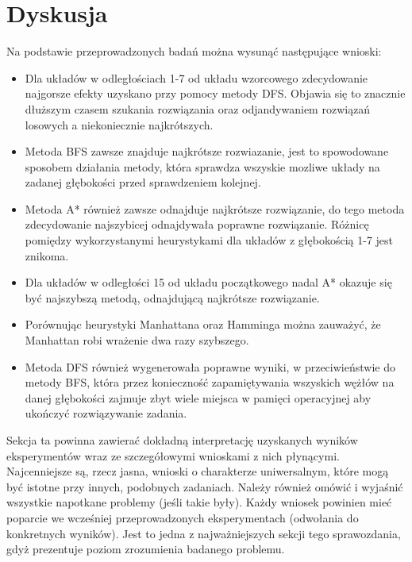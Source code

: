 \documentclass{classrep}
\begin{document}
    \section{Dyskusja}
    {\color{blue}

    Na podstawie przeprowadzonych badań można wysunąć następujące wnioski:
    \begin{itemize}
        \item Dla układów w odległościach 1-7 od układu wzorcowego zdecydowanie najgorsze efekty uzyskano przy pomocy metody DFS.
            Objawia się to znacznie dłuższym czasem szukania rozwiązania oraz odjandywaniem rozwiązań losowych a niekoniecznie najkrótszych.
        \item Metoda BFS zawsze znajduje najkrótsze rozwiazanie, jest to spowodowane sposobem działania metody, która
                sprawdza wszyskie mozliwe układy na zadanej głębokości przed sprawdzeniem kolejnej.
        \item Metoda A* również zawsze odnajduje najkrótsze rozwiązanie, do tego metoda zdecydowanie najszybicej odnajdywała poprawne rozwiązanie.
       Różnicę pomiędzy wykorzystanymi heurystykami dla układów z głębokością 1-7 jest znikoma.
        \item Dla układów w odległości 15 od układu początkowego nadal A* okazuje się być najszybszą metodą, odnajdującą najkrótsze rozwiązanie.
        \item Porównując heurystyki Manhattana oraz Hamminga można zauważyć, że Manhattan robi wrażenie dwa razy szybszego.
        \item Metoda DFS również wygenerowała poprawne wyniki, w przeciwieństwie do metody BFS, która przez konieczność zapamiętywania wszyskich wężłów na danej głębokości
            zajmuje zbyt wiele miejsca w pamięci operacyjnej aby ukończyć rozwiązywanie zadania.
    \end{itemize}


    Sekcja ta powinna zawierać dokładną interpretację uzyskanych wyników
    eksperymentów wraz ze szczegółowymi wnioskami z nich płynącymi. Najcenniejsze
    są, rzecz jasna, wnioski o charakterze uniwersalnym, które mogą być istotne
    przy innych, podobnych zadaniach. Należy również omówić i wyjaśnić wszystkie
    napotkane problemy (jeśli takie były). Każdy wniosek powinien mieć poparcie we
    wcześniej przeprowadzonych eksperymentach (odwołania do konkretnych wyników).
    Jest to jedna z najważniejszych sekcji tego sprawozdania, gdyż prezentuje
    poziom zrozumienia badanego problemu.}
\end{document}
